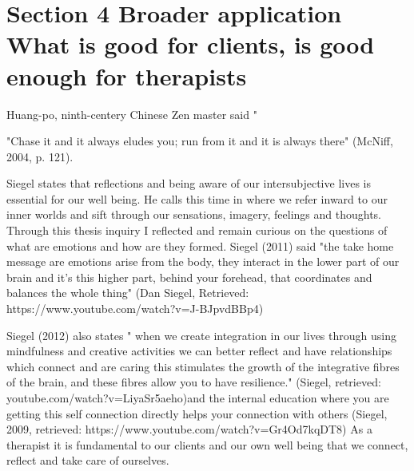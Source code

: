 \chapter{Section 4
Broader application
What is good for clients, is good enough for therapists}




Huang-po, ninth-centery Chinese Zen master said "

"Chase it and it always eludes you; run from it and it is always there" (McNiff, 2004, p. 121). 

Siegel states that reflections and being aware of our intersubjective lives is essential for our well being. He calls this time in where we refer inward to our inner worlds and sift through our sensations, imagery, feelings and thoughts. Through this thesis inquiry I reflected and remain curious on the questions of what are emotions and how are they formed. Siegel (2011) said 
"the take home message are emotions arise from the body, they interact in the lower part of our brain and it's this higher part, behind your forehead, that coordinates and balances the whole thing" (Dan Siegel, Retrieved: https://www.youtube.com/watch?v=J-BJpvdBBp4)

Siegel (2012) also states " when we create integration in our lives through using mindfulness and creative activities we can better reflect and have relationships which connect and are caring this stimulates the growth of the integrative fibres of the brain, and these fibres allow you to have resilience." (Siegel, retrieved: youtube.com/watch?v=LiyaSr5aeho)and the internal education where you are getting this self connection directly helps your connection with others (Siegel, 2009, retrieved: https://www.youtube.com/watch?v=Gr4Od7kqDT8) As a therapist it is fundamental to our clients and our own well being that we connect, reflect and take care of ourselves. 



